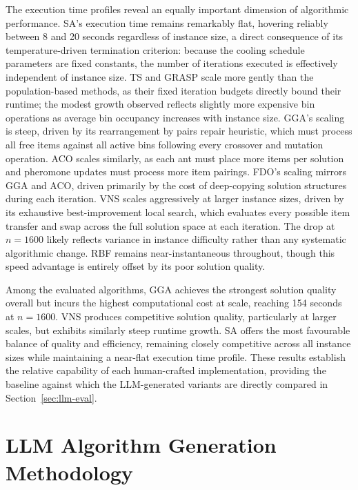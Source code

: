 \documentclass[11pt]{article}
\begin{document}
The execution time profiles reveal an equally important dimension of algorithmic
performance. SA's execution time remains remarkably flat, hovering reliably between 8
and 20 seconds regardless of instance size, a direct consequence of its
temperature-driven termination criterion: because the cooling schedule parameters are
fixed constants, the number of iterations executed is effectively independent of
instance size. TS and GRASP scale more gently than the population-based methods, as
their fixed iteration budgets directly bound their runtime; the modest growth observed
reflects slightly more expensive bin operations as average bin occupancy increases with
instance size. GGA's scaling is steep, driven by its rearrangement by pairs repair
heuristic, which must process all free items against all active bins following every
crossover and mutation operation. ACO scales similarly, as each ant must place more items per solution and pheromone updates must process more item pairings. FDO's scaling
mirrors GGA and ACO, driven primarily by the cost of deep-copying solution structures
during each iteration. VNS scales aggressively at larger instance sizes, driven by its exhaustive
best-improvement local search, which evaluates every possible item transfer
and swap across the full solution space at each iteration. The drop at
$n = 1600$ likely reflects variance in instance difficulty rather than any
systematic algorithmic change. RBF
remains near-instantaneous throughout, though this speed advantage is entirely offset
by its poor solution quality.

Among the evaluated algorithms, GGA achieves the strongest solution quality overall but
incurs the highest computational cost at scale, reaching 154 seconds at $n = 1600$. VNS
produces competitive solution quality, particularly at larger scales, but exhibits
similarly steep runtime growth. SA offers the most favourable balance of quality and
efficiency, remaining closely competitive across all instance sizes while maintaining a
near-flat execution time profile. These results establish the relative capability of
each human-crafted implementation, providing the baseline against which the
LLM-generated variants are directly compared in Section~\ref{sec:llm-eval}.

\section{LLM Algorithm Generation Methodology}
\end{document}
